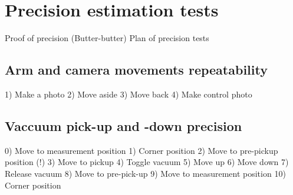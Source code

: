 \chapter{Precision estimation tests}

Proof of precision (Butter-butter)
Plan of precision tests

\section{Arm and camera movements repeatability }

1) Make a photo
2) Move aside
3) Move back
4) Make control photo

\section{Vaccuum pick-up and -down precision}

0) Move to measurement position
1) Corner position
2) Move to pre-pickup position (!)
3) Move to pickup
4) Toggle vacuum 
5) Move up
6) Move down
7) Release vacuum
8) Move to pre-pick-up
9) Move to measurement position
10) Corner position


